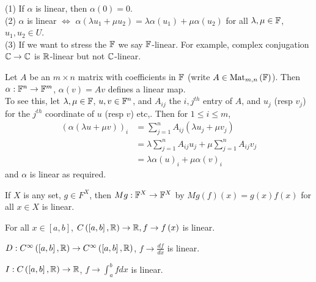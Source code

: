 \documentclass[a4paper]{article}
\begin{document}
\begin{rem}
(1) If $\alpha$ is linear, then $\alpha\left(0\right) = 0$.\\
(2) $\alpha$ is linear $\Leftrightarrow$ $\alpha \left(\lambda u_1 + \mu u_2\right) = \lambda \alpha\left(u_1\right) + \mu \alpha\left(u_2\right)$ for all $\lambda,\mu \in \mathbb{F}$, $u_1,u_2 \in U$.\\
(3) If we want to stress the $\mathbb{F}$ we say $\mathbb{F}$-linear. For example, complex conjugation $\mathbb{C} \to \mathbb{C}$ is $\mathbb{R}$-linear but not $\mathbb{C}$-linear.
\end{rem}

\begin{eg}
Let $A$ be an $m \times n$ matrix with coefficients in $\mathbb{F}$ (write $A \in \text{Mat}_{m,n} \left(\mathbb{F}\right)$). Then $\alpha: \mathbb{F}^n \to \mathbb{F}^m$, $\alpha\left(v\right) = Av$ defines a linear map.\\
To see this, let $\lambda,\mu \in \mathbb{F}$, $u,v \in \mathbb{F}^n$, and $A_{ij}$ the $i,j^{th}$ entry of $A$, and $u_j$ (resp $v_j$) for the $j^{th}$ coordinate of $u$ (resp $v$) etc,. Then for $1 \leq i \leq m$,
\begin{equation*}
\begin{aligned}
\left(\alpha\left(\lambda u + \mu v\right)\right)_i &= \sum_{j=1}^n A_{ij} \left(\lambda u_j + \mu v_j\right) \\
&= \lambda \sum_{j=1}^n A_{ij} u_j + \mu \sum_{j=1}^n A_{ij} v_j\\
&= \lambda \alpha\left(u\right)_i + \mu\alpha\left(v\right)_i
\end{aligned}
\end{equation*}
and $\alpha$ is linear as required.
\end{eg}

\begin{eg}
If $X$ is any set, $g \in F^X$, then $Mg: \mathbb{F}^X \to \mathbb{F}^X$ by $Mg\left(f\right) \left(x\right) = g\left(x\right)f\left(x\right)$ for all $x \in X$ is linear.
\end{eg}

\begin{eg}
For all $x \in \left[a,b\right]$, $C\left(\left[a,b\right],\mathbb{R}\right) \to \mathbb{R}, f \to f\left(x\right)$ is linear.
\end{eg}

\begin{eg}
$D: C^\infty \left(\left[a,b\right],\mathbb{R}\right) \to C^\infty \left(\left[a,b\right],\mathbb{R}\right)$, $f \to \frac{df}{dx}$ is linear.
\end{eg}

\begin{eg}
$I:C \left(\left[a,b\right],\mathbb{R}\right) \to \mathbb{R}$, $f \to \int_a^b f dx$ is linear.
\end{eg}
\end{document}

